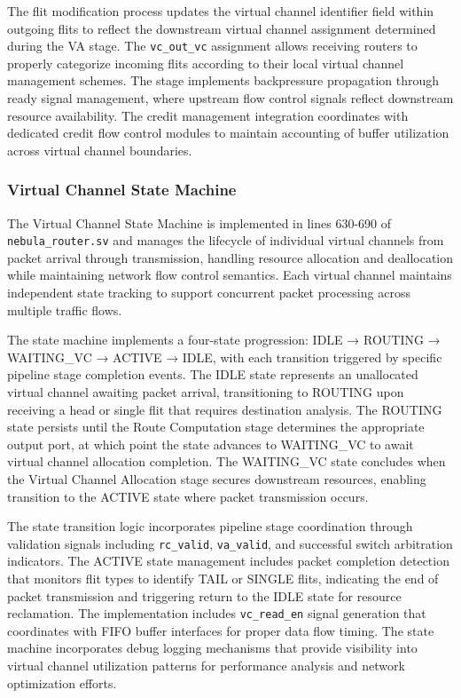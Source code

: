 \documentclass[12pt,letterpaper]{article}
\begin{document}
The flit modification process updates the virtual channel identifier field within outgoing flits to reflect the downstream virtual channel assignment determined during the VA stage. The \texttt{vc\_out\_vc} assignment allows receiving routers to properly categorize incoming flits according to their local virtual channel management schemes. The stage implements backpressure propagation through ready signal management, where upstream flow control signals reflect downstream resource availability. The credit management integration coordinates with dedicated credit flow control modules to maintain accounting of buffer utilization across virtual channel boundaries.

\subsubsection{Virtual Channel State Machine}

The Virtual Channel State Machine is implemented in lines 630-690 of \texttt{nebula\_router.sv} and manages the lifecycle of individual virtual channels from packet arrival through transmission, handling resource allocation and deallocation while maintaining network flow control semantics. Each virtual channel maintains independent state tracking to support concurrent packet processing across multiple traffic flows.

The state machine implements a four-state progression: IDLE → ROUTING → WAITING\_VC → ACTIVE → IDLE, with each transition triggered by specific pipeline stage completion events. The IDLE state represents an unallocated virtual channel awaiting packet arrival, transitioning to ROUTING upon receiving a head or single flit that requires destination analysis. The ROUTING state persists until the Route Computation stage determines the appropriate output port, at which point the state advances to WAITING\_VC to await virtual channel allocation completion. The WAITING\_VC state concludes when the Virtual Channel Allocation stage secures downstream resources, enabling transition to the ACTIVE state where packet transmission occurs.

The state transition logic incorporates pipeline stage coordination through validation signals including \texttt{rc\_valid}, \texttt{va\_valid}, and successful switch arbitration indicators. The ACTIVE state management includes packet completion detection that monitors flit types to identify TAIL or SINGLE flits, indicating the end of packet transmission and triggering return to the IDLE state for resource reclamation. The implementation includes \texttt{vc\_read\_en} signal generation that coordinates with FIFO buffer interfaces for proper data flow timing. The state machine incorporates debug logging mechanisms that provide visibility into virtual channel utilization patterns for performance analysis and network optimization efforts.
\end{document}
